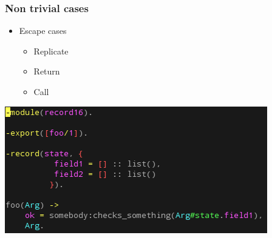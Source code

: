 \begin{frame}
\frametitle{Non trivial cases}

\begin{itemize}
	\item Escape cases
	\begin{itemize}
		\item Replicate
		\item Return
		\item Call
	\end{itemize}
\end{itemize}

\begin{center}
\includegraphics[scale=0.45]{../figures/test16}
\end{center}
\end{frame}

